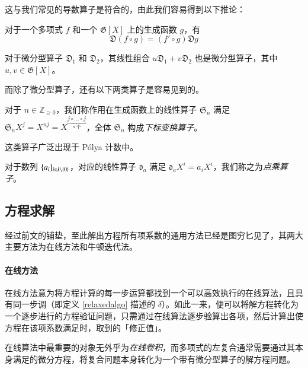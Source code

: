 这与我们常见的导数算子是符合的，由此我们容易得到以下推论：

\begin{lemma}
对于一个多项式 $f$ 和一个 $\mathfrak G[X]$ 上的生成函数 $g$，有
$$
\mathfrak D (f\circ g) = (f' \circ g) \mathfrak D g
$$
\end{lemma}

\begin{lemma} \label{der}
对于微分型算子 $\mathfrak D_1$ 和 $\mathfrak D_2$，其线性组合 $u\mathfrak D_1 + v\mathfrak D_2$ 也是微分型算子，其中 $u,v\in \mathfrak G[X]$。
\end{lemma}

而除了微分型算子，还有以下两类算子是容易见到的。

\begin{definition}[下标变换算子]
对于 $n\in \mathbb Z_{\ge 0}$，我们称作用在生成函数上的线性算子 $\mathfrak S_n$ 满足 $\mathfrak S_n X^j = X^{nj} = X^{\underbracket{j\circ \dots\circ j}_{\text{$n$ 个}}}$，全体 $\mathfrak S_n$ 构成\emph{下标变换算子}。
\end{definition}

这类算子广泛出现于 P\'olya 计数中。

\begin{definition}[点乘算子]
对于数列 $\{a_i\}_{i\in {I \backslash \{0\}}}$，对应的线性算子 $\mathfrak d_a$ 满足 $\mathfrak d_a X^i = a_iX^i$，我们称之为\emph{点乘算子}。
\end{definition}

\subsection{方程求解}

经过前文的铺垫，至此解出方程所有项系数的通用方法已经是图穷匕见了，其两大主要方法为在线方法和牛顿迭代法。

\paragraph{在线方法}

在线方法意为将方程计算的每一步运算都找到一个可以高效执行的在线算法，且具有同一步调（即定义 \ref{relaxedalgo} 描述的 $\delta$）。如此一来，便可以将解方程转化为一个逐步进行的方程验证问题，只需通过在线算法逐步验算出各项，然后计算出使方程在该项系数满足时，取到的「修正值」。

在线算法中最重要的对象无外乎为\emph{在线卷积}，而多项式的左复合通常需要通过其本身满足的微分方程，将复合问题本身转化为一个带有微分型算子的解方程问题。

